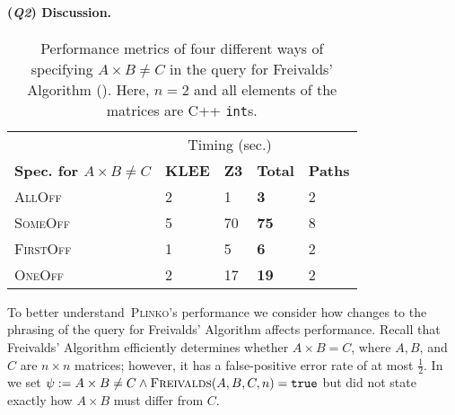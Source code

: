 \documentclass[acmsmall,review,anonymous]{acmart}\settopmatter{printfolios=true,printccs=false,printacmref=false}
\newcommand{\SYSTEM}{\textsc{Plinko}\xspace}
\newcommand{\Q}[1]{(\textit{\textbf{Q#1}})}
\begin{document}
\paragraph*{\Q{2} Discussion.}
\begin{table}
  \centering
  \caption{Performance metrics of four different ways of specifying $A \times B \neq C$ in the query for Freivalds' Algorithm (). Here, $n=2$ and all elements of the matrices are C++ \texttt{int}s.}
  \label{tab:q2}
  \begin{tabular}{@{}lllll@{}}
    \toprule
    & \multicolumn{3}{c}{Timing (sec.)} &\\ \cmidrule{2-4}
    \textbf{Spec. for $A \times B \neq C$} & \textbf{KLEE} & \textbf{Z3} & \textbf{Total} & \textbf{Paths}\\ \midrule
    \textsc{AllOff} & 2 & 1 & \textbf{3} & 2\\
    \textsc{SomeOff}& 5 & 70 & \textbf{75} & 8\\
    \textsc{FirstOff}& 1 & 5 & \textbf{6} & 2\\
    \textsc{OneOff} & 2 & 17 & \textbf{19} & 2\\
    \bottomrule
  \end{tabular}
\end{table}
To better understand~\SYSTEM's performance we consider how changes to the phrasing of the query for Freivalds' Algorithm affects performance.
% 
Recall that Freivalds' Algorithm efficiently determines whether $A \times B = C$, where $A,B$, and $C$ are $n \times n$ matrices; however, it has a false-positive error rate of at most $\frac{1}{2}$.
% 
In~ we set $\psi := A \times B \neq C \wedge \textsc{Freivalds}(A,B,C,n) = \mathtt{true}$ but did not state exactly how $A \times B$ must differ from $C$.
\end{document}
